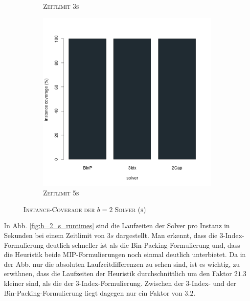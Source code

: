 \begin{figure}[H]
\begin{subfigure}[b]{0.3\textwidth}
\caption{\textsc{Zeitlimit 3s}}
\label{fig:instance_cov_b=2_s_b}
\end{subfigure}
\hfill
\begin{subfigure}[b]{0.3\textwidth}
\centering
\includegraphics[width=1.2\textwidth]{img/solver_instance_coverage_b=2_s_5s.png}
\caption{\textsc{Zeitlimit 5s}}
\label{fig:instance_cov_b=2_s_c}
\end{subfigure}

\caption{\textsc{Instance-Coverage der $b=2$ Solver (s)}}
\label{fig:instance_cov_b=2_s}
\end{figure}

In Abb. \ref{fig:b=2_s_runtimes} sind die Laufzeiten der Solver pro Instanz in Sekunden bei einem Zeitlimit von $3s$ dargestellt.
Man erkennt, dass die 3-Index-Formulierung deutlich schneller ist als die Bin-Packing-Formulierung und, dass die Heuristik beide MIP-Formulierungen noch einmal deutlich unterbietet. Da in der Abb. nur die absoluten Laufzeitdifferenzen zu sehen sind,
ist es wichtig, zu erwähnen, dass die Laufzeiten der Heuristik durchschnittlich um den Faktor $21.3$ kleiner sind,
als die der 3-Index-Formulierung. Zwischen der 3-Index- und der Bin-Packing-Formulierung liegt dagegen nur ein Faktor von $3.2$.

